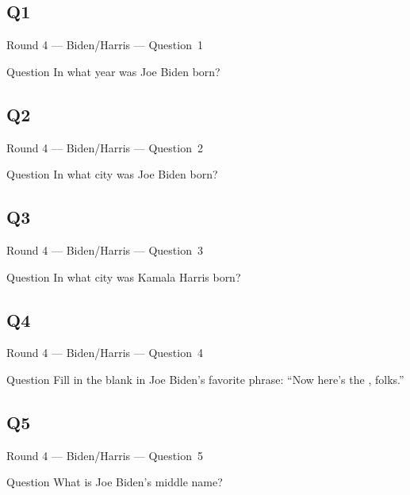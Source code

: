 \documentclass[11pt]{beamer}
\begin{document}
\subsection*{Q1}
\begin{frame}[t]{Round 4 --- Biden/Harris --- \mbox{Question 1}}
\vspace{-0.5em}
\begin{block}{Question}
In what year was Joe Biden born?
\end{block}
\end{frame}
\subsection*{Q2}
\begin{frame}[t]{Round 4 --- Biden/Harris --- \mbox{Question 2}}
\vspace{-0.5em}
\begin{block}{Question}
In what city was Joe Biden born?
\end{block}
\end{frame}
\subsection*{Q3}
\begin{frame}[t]{Round 4 --- Biden/Harris --- \mbox{Question 3}}
\vspace{-0.5em}
\begin{block}{Question}
In what city was Kamala Harris born?
\end{block}
\end{frame}
\subsection*{Q4}
\begin{frame}[t]{Round 4 --- Biden/Harris --- \mbox{Question 4}}
\vspace{-0.5em}
\begin{block}{Question}
Fill in the blank in Joe Biden's favorite phrase: ``Now here's the \textunderscore{}\textunderscore{}\textunderscore{}\textunderscore{}\textunderscore{}\textunderscore{}\textunderscore{}\textunderscore{}, folks.''
\end{block}
\end{frame}
\subsection*{Q5}
\begin{frame}[t]{Round 4 --- Biden/Harris --- \mbox{Question 5}}
\vspace{-0.5em}
\begin{block}{Question}
What is Joe Biden's middle name?
\end{block}
\end{frame}
\end{document}
